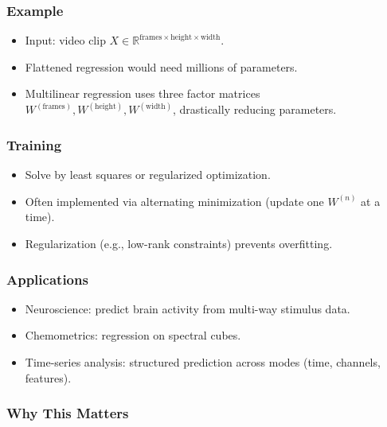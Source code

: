 \documentclass[
  letterpaper,
  DIV=11,
  numbers=noendperiod]{scrreprt}
\providecommand{\tightlist}{%
  \setlength{\itemsep}{0pt}\setlength{\parskip}{0pt}}
\begin{document}
\subsubsection{Example}\label{example-1}

\begin{itemize}
\tightlist
\item
  Input: video clip
  \(X \in \mathbb{R}^{\text{frames} \times \text{height} \times \text{width}}\).
\item
  Flattened regression would need millions of parameters.
\item
  Multilinear regression uses three factor matrices
  \(W^{(\text{frames})}, W^{(\text{height})}, W^{(\text{width})}\),
  drastically reducing parameters.
\end{itemize}

\subsubsection{Training}\label{training}

\begin{itemize}
\tightlist
\item
  Solve by least squares or regularized optimization.
\item
  Often implemented via alternating minimization (update one \(W^{(n)}\)
  at a time).
\item
  Regularization (e.g., low-rank constraints) prevents overfitting.
\end{itemize}

\subsubsection{Applications}\label{applications-5}

\begin{itemize}
\tightlist
\item
  Neuroscience: predict brain activity from multi-way stimulus data.
\item
  Chemometrics: regression on spectral cubes.
\item
  Time-series analysis: structured prediction across modes (time,
  channels, features).
\end{itemize}

\subsubsection{Why This Matters}\label{why-this-matters-45}
\end{document}
